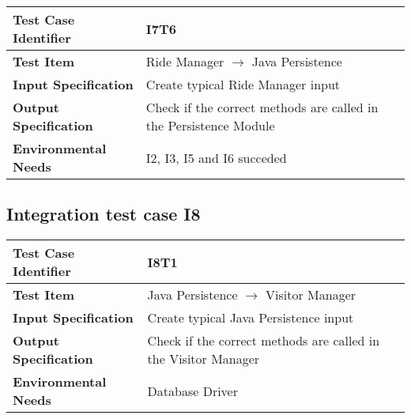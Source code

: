 \begin{table}[!htbp]
\begin{center}
\begin{tabular}[t]{p{}|p{}}

\hline
\textbf{Test Case Identifier} & I7T6 \\
\hline
\textbf{Test Item} & Ride Manager $\rightarrow$ Java Persistence \\
\hline
\textbf{Input Specification} & Create typical Ride Manager input \\
\hline
\textbf{Output Specification} & Check if the correct methods are called in the Persistence Module \\
\hline
\textbf{Environmental Needs} & I2, I3, I5 and I6 succeded \\
\hline

\end{tabular}
\end{center}
\end{table}
\clearpage

\subsection{Integration test case I8}

\begin{table}[!htbp]
\begin{center}
\begin{tabular}[t]{p{}|p{}}

\hline
\textbf{Test Case Identifier} & I8T1 \\
\hline
\textbf{Test Item} & Java Persistence $\rightarrow$ Visitor Manager \\
\hline
\textbf{Input Specification} & Create typical Java Persistence input  \\
\hline
\textbf{Output Specification} & Check if the correct methods are called in the Visitor Manager \\
\hline
\textbf{Environmental Needs} & Database Driver \\
\hline

\end{tabular}
\end{center}
\end{table}

